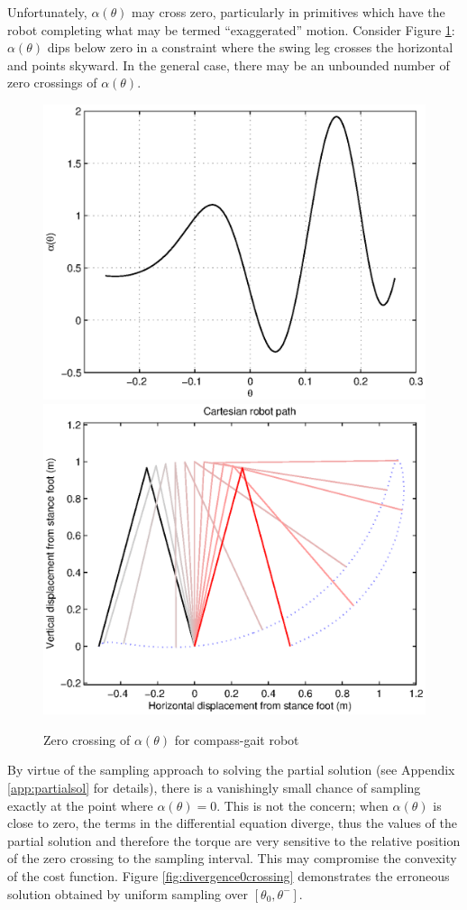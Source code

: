Unfortunately, $\alpha(\theta)$ may cross zero, particularly in primitives which have the robot completing what may be termed ``exaggerated'' motion. Consider Figure \ref{fig:alphazerocrossing}: $\alpha(\theta)$ dips below zero in a constraint where the swing leg crosses the horizontal and points skyward. In the general case, there may be an unbounded number of zero crossings of $\alpha(\theta)$.

\begin{figure}
	\centering
	\includegraphics[width=0.49\linewidth]{4VirtConstLib/al0Crossing.eps}
	\includegraphics[width=0.49\linewidth]{4VirtConstLib/xy-0Crossing.eps}
	\caption{Zero crossing of $\alpha(\theta)$ for compass-gait robot}
	\label{fig:alphazerocrossing}
\end{figure}

By virtue of the sampling approach to solving the partial solution (see Appendix \ref{app:partialsol} for details), there is a vanishingly small chance of sampling exactly at the point where $\alpha(\theta)=0$. This is not the concern; when $\alpha(\theta)$ is close to zero, the terms in the differential equation diverge, thus the values of the partial solution and therefore the torque are very sensitive to the relative position of the zero crossing to the sampling interval. This may compromise the convexity of the cost function. Figure \ref{fig:divergence0crossing} demonstrates the erroneous solution obtained by uniform sampling over $[\theta_0, \theta^-]$.
 
